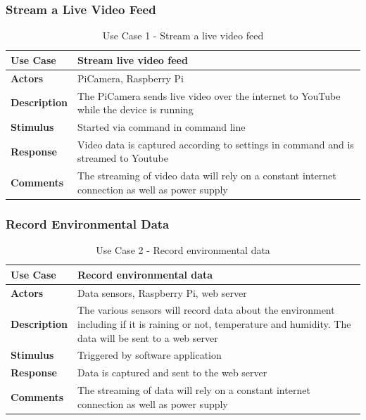 \documentclass[10pt,a4paper]{article}
\begin{document}
\subsubsection{Stream a Live Video Feed}
\begin{table}[h!]
\centering
\begin{tabular}{p{2cm}p{9cm}}
\toprule
\textbf{Use Case}    & Stream live video feed                                                                          \\ \midrule
\textbf{Actors}      & PiCamera, Raspberry Pi                                                                          \\
\textbf{Description} & The PiCamera sends live video over the internet to YouTube while the device is running         \\
\textbf{Stimulus}    & Started via command in command line                                                             \\
\textbf{Response}    & Video data is captured according to settings in command and is streamed to Youtube              \\
\textbf{Comments}    & The streaming of video data will rely on a constant internet connection as well as power supply \\ \bottomrule
\end{tabular}
\caption{Use Case 1 - Stream a live video feed}
\label{tab:useCase1}
\end{table}

\subsubsection{Record Environmental Data}
\begin{table}[h!]
\centering
\begin{tabular}{p{2cm}p{9cm}}
\toprule
\textbf{Use Case}    & Record environmental data                                                                          \\ \midrule
\textbf{Actors}      & Data sensors, Raspberry Pi, web server                                                                          \\
\textbf{Description} & The various sensors will record data about the environment including if it is raining or not, temperature and humidity. The data will be sent to a web server         \\
\textbf{Stimulus}    & Triggered by software application\\
\textbf{Response}    & Data is captured and sent to the web server              \\
\textbf{Comments}    & The streaming of data will rely on a constant internet connection as well as power supply \\ \bottomrule
\end{tabular}
\caption{Use Case 2 - Record environmental data}
\label{tab:useCase1}
\end{table}
\end{document}

